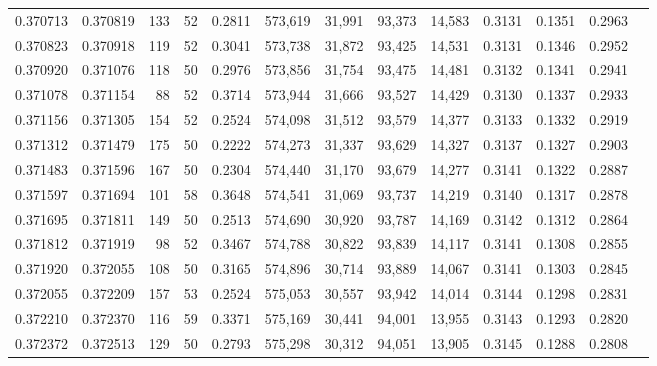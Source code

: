 \begin{tabular}{rrrrrrrrrrrrr}
0.370713 & 0.370819 &   133 &  52 &                                     0.2811 & 573,619 &  31,991 &  93,373 &  14,583 & 0.3131 & 0.1351 & 0.2963 \\
0.370823 & 0.370918 &   119 &  52 &                                     0.3041 & 573,738 &  31,872 &  93,425 &  14,531 & 0.3131 & 0.1346 & 0.2952 \\
0.370920 & 0.371076 &   118 &  50 &                                     0.2976 & 573,856 &  31,754 &  93,475 &  14,481 & 0.3132 & 0.1341 & 0.2941 \\
0.371078 & 0.371154 &    88 &  52 &                                     0.3714 & 573,944 &  31,666 &  93,527 &  14,429 & 0.3130 & 0.1337 & 0.2933 \\
0.371156 & 0.371305 &   154 &  52 &                                     0.2524 & 574,098 &  31,512 &  93,579 &  14,377 & 0.3133 & 0.1332 & 0.2919 \\
0.371312 & 0.371479 &   175 &  50 &                                     0.2222 & 574,273 &  31,337 &  93,629 &  14,327 & 0.3137 & 0.1327 & 0.2903 \\
0.371483 & 0.371596 &   167 &  50 &                                     0.2304 & 574,440 &  31,170 &  93,679 &  14,277 & 0.3141 & 0.1322 & 0.2887 \\
0.371597 & 0.371694 &   101 &  58 &                                     0.3648 & 574,541 &  31,069 &  93,737 &  14,219 & 0.3140 & 0.1317 & 0.2878 \\
0.371695 & 0.371811 &   149 &  50 &                                     0.2513 & 574,690 &  30,920 &  93,787 &  14,169 & 0.3142 & 0.1312 & 0.2864 \\
0.371812 & 0.371919 &    98 &  52 &                                     0.3467 & 574,788 &  30,822 &  93,839 &  14,117 & 0.3141 & 0.1308 & 0.2855 \\
0.371920 & 0.372055 &   108 &  50 &                                     0.3165 & 574,896 &  30,714 &  93,889 &  14,067 & 0.3141 & 0.1303 & 0.2845 \\
0.372055 & 0.372209 &   157 &  53 &                                     0.2524 & 575,053 &  30,557 &  93,942 &  14,014 & 0.3144 & 0.1298 & 0.2831 \\
0.372210 & 0.372370 &   116 &  59 &                                     0.3371 & 575,169 &  30,441 &  94,001 &  13,955 & 0.3143 & 0.1293 & 0.2820 \\
0.372372 & 0.372513 &   129 &  50 &                                     0.2793 & 575,298 &  30,312 &  94,051 &  13,905 & 0.3145 & 0.1288 & 0.2808 \\

\end{tabular}

